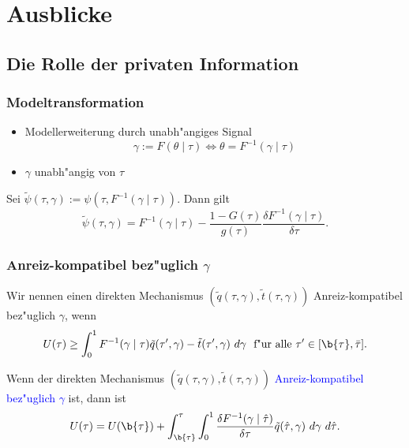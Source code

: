 \section{Ausblicke}

\subsection{Die Rolle der privaten Information}
\begin{frame}
\frametitle{Modeltransformation}
\justifying
\begin{itemize}
  \item Modellerweiterung durch unabh"angiges Signal
  \begin{equation*}
    \gamma := F(\theta \mid \tau) \Leftrightarrow \theta = F^{-1}(\gamma \mid \tau)
  \end{equation*}
  \item $\gamma$ unabh"angig von $\tau$
\end{itemize}
\begin{thmL}
  Sei $\tilde{\psi}(\tau, \gamma) := \psi(\tau, F^{-1}(\gamma \mid \tau))$. Dann gilt
  \begin{equation*}
    \tilde{\psi}(\tau, \gamma) = F^{-1}(\gamma \mid \tau) - \dfrac{1-G(\tau)}{g(\tau)} \dfrac{\delta F^{-1}(\gamma \mid \tau)}{\delta \tau}.
  \end{equation*}
\end{thmL}
\end{frame}

\begin{frame}
\frametitle{Anreiz-kompatibel bez"uglich $\gamma$}
\justifying
\begin{thmD}
  Wir nennen einen direkten Mechanismus $(\tilde{q}(\tau, \gamma), \tilde{t}(\tau, \gamma))$ Anreiz-kompatibel bez"uglich $\gamma$, wenn
  \begin{equation*}
    U(\tau) \geq \int_{0}^{1} F^{-1}(\gamma \mid \tau) \tilde{q}(\tau', \gamma) - \tilde{t}(\tau', \gamma) \ d \gamma \text{~ f"ur alle } \tau' \in [\b{\tau}, \bar{\tau}].
  \end{equation*}
\end{thmD}
\begin{thmP}
  Wenn der direkten Mechanismus $(\tilde{q}(\tau, \gamma), \tilde{t}(\tau, \gamma))$ \textcolor{blue}{Anreiz-kompatibel bez"uglich $\gamma$} ist, dann ist
  \begin{equation*}
    U(\tau) = U(\b{\tau}) + \int_{\b{\tau}}^{\tau} \int_{0}^{1} \dfrac{\delta F^{-1}(\gamma \mid \hat{\tau})}{\delta \tau} \tilde{q}(\hat{\tau}, \gamma) \ d \gamma \ d \hat{\tau}.
  \end{equation*}
\end{thmP}
\end{frame}

